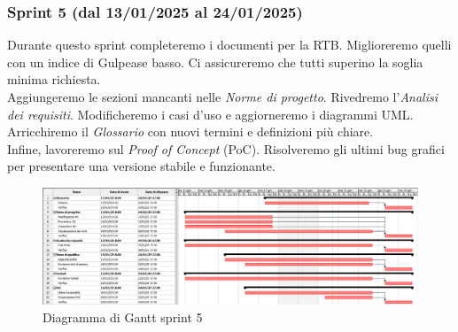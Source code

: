         \subsubsection{Sprint 5 (dal 13/01/2025 al 24/01/2025)}
        Durante questo sprint completeremo i documenti per la RTB. Miglioreremo quelli con un indice di Gulpease basso. Ci assicureremo che tutti superino la soglia minima richiesta.\\
        Aggiungeremo le sezioni mancanti nelle \textit{Norme di progetto}. Rivedremo l'\textit{Analisi dei requisiti}. Modificheremo i casi d'uso e aggiorneremo i diagrammi UML. Arricchiremo il \textit{Glossario} con nuovi termini e definizioni più chiare.\\
        Infine, lavoreremo sul \textit{Proof of Concept} (PoC). Risolveremo gli ultimi bug grafici per presentare una versione stabile e funzionante.
        
        \begin{figure}[h!]
            \centering
            \includegraphics[scale = 0.4]{template/images/gantt5.png}
            \caption{Diagramma di Gantt sprint 5}
            \label{fig:3.4} %
        \end{figure}

 
